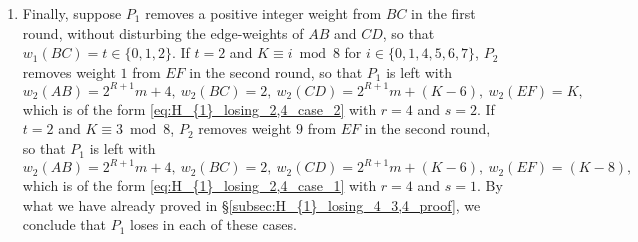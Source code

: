 \documentclass[11pt,reqno]{amsart}
\theoremstyle{definition}
\theoremstyle{definition}
\begin{document}
\begin{enumerate}
If $k \in \{7,8,9,10,12,13,\ldots,K-7\}$ with $k \equiv j \bmod 8$ for $j \in \{0,1,2,4,5,6,7\}$, $P_{2}$ removes weight $(K+1-k)$ from $CD$ in the second round, leaving $P_{1}$ with
\begin{equation}
w_{2}(AB)=2^{R+1}m+4,\ w_{2}(BC)=3,\ w_{2}(CD)=2^{R+1}m+(k-7),\ w_{2}(EF)=k,\label{intermediate_eq_2}
\end{equation}
which, for $k\geqslant 12$, is of the form \eqref{eq:H_{1}_losing_2,4_case_2} with $r=4$ and $s=3$, and as $w_{2}(EF)=k \leqslant K$, $P_{1}$ loses by our induction hypothesis. The configuration in \eqref{intermediate_eq_2} is of the form \eqref{eq:H_{1}_losing_0,1,3} with either $r=0$ (when $k=7$) or $r=1$ (when $k=8$) or $r=3$ (when $k=10$), or of the form \eqref{eq:H_{1}_losing_2,4_case_3} with $r=2$ and $s=3$ (when $k=9$). Note that the case of $k=(K-7)$ is taken care of here. If $k \in \{11,12,\ldots,K-8\}$ with $k \equiv 3 \bmod 8$, $P_{2}$ removes weight $(K-7-k)$ from $CD$ in the second round, leaving $P_{1}$ with 
\begin{equation}
w_{2}(AB)=2^{R+1}m+4,\ w_{2}(BC)=3,\ w_{2}(CD)=2^{R+1}m+(k+1),\ w_{2}(EF)=k,\nonumber
\end{equation}
which is of the form \eqref{eq:H_{1}_losing_2,4_case_1} with $r=4$ and $s=3$, and as $w_{2}(EF)=k \leqslant K$, $P_{1}$ loses by our induction hypothesis. If $k\in\{5,6\}$, $P_{2}$ removes weight $(K-6)$ from $CD$, and weight $(7-k)$ from $BC$, in the second round, leaving $P_{1}$ with
\begin{equation}
w_{2}(AB)=2^{R+1}m+4,\ w_{2}(BC)=k-4,\ w_{2}(CD)=2^{R+1}m,\ w_{2}(EF)=k,\nonumber
\end{equation}
which is of the form \eqref{eq:H_{1}_losing_0,1,3} with $r=0$. By what we have already proved in \S\ref{subsec:proof_eq_H_{1}_losing_0}, \S\ref{subsec:H_{1}_losing_1_proof}, \S\ref{subsec:H_{1}_losing_3_proof} and \S\ref{subsec:proof_eq_H_{1}_losing_2_3}, we conclude that $P_{1}$ loses in each of these cases.

\item Finally, suppose $P_{1}$ removes a positive integer weight from $BC$ in the first round, without disturbing the edge-weights of $AB$ and $CD$, so that $w_{1}(BC)=t\in\{0,1,2\}$. If $t=2$ and $K\equiv i \bmod 8$ for $i \in \{0,1,4,5,6,7\}$, $P_{2}$ removes weight $1$ from $EF$ in the second round, so that $P_{1}$ is left with
\begin{equation}
w_{2}(AB)=2^{R+1}m+4,\ w_{2}(BC)=2,\ w_{2}(CD)=2^{R+1}m+(K-6),\ w_{2}(EF)=K,\nonumber
\end{equation}
which is of the form \eqref{eq:H_{1}_losing_2,4_case_2} with $r=4$ and $s=2$. If $t=2$ and $K \equiv 3 \bmod 8$, $P_{2}$ removes weight $9$ from $EF$ in the second round, so that $P_{1}$ is left with
\begin{equation}
w_{2}(AB)=2^{R+1}m+4,\ w_{2}(BC)=2,\ w_{2}(CD)=2^{R+1}m+(K-6),\ w_{2}(EF)=(K-8),\nonumber
\end{equation}
which is of the form \eqref{eq:H_{1}_losing_2,4_case_1} with $r=4$ and $s=1$. By what we have already proved in \S\ref{subsec:H_{1}_losing_4_3,4_proof}, we conclude that $P_{1}$ loses in each of these cases.


\end{enumerate}
\end{document}
